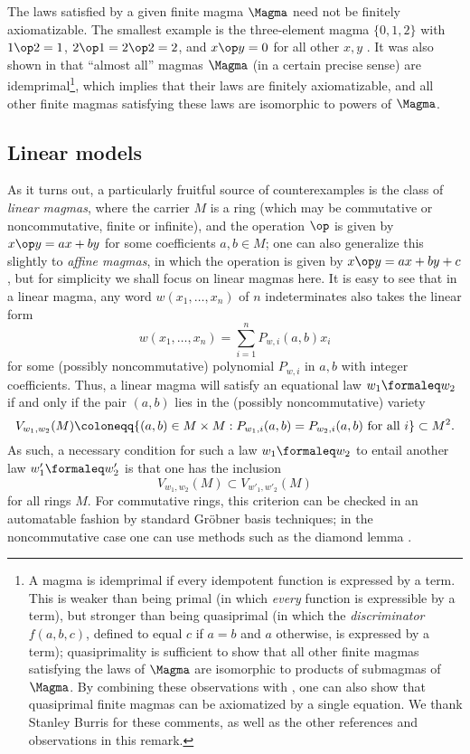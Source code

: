 \begin{remark} The laws satisfied by a given finite magma $\Magma$ need not be finitely axiomatizable.  The smallest example is the three-element magma $\{0,1,2\}$ with $1 \op 2 = 1$, $2 \op 1 = 2 \op 2 = 2$, and $x \op y = 0$ for all other $x,y$ \cite{murskii-1}.  It was also shown in \cite{murskii-2} that ``almost all'' magmas $\Magma$ (in a certain precise sense) are idemprimal\footnote{A magma is idemprimal if every idempotent function is expressed by a term.  This is weaker than being primal (in which \emph{every} function is expressible by a term), but stronger than being quasiprimal (in which the \emph{discriminator} $f(a,b,c)$, defined to equal $c$ if $a=b$ and $a$ otherwise, is expressed by a term); quasiprimality is sufficient to show that all other finite magmas satisfying the laws of $\Magma$ are isomorphic to products of submagmas of $\Magma$.  By combining these observations with \cite{Padmanabhan}, one can also show that quasiprimal finite magmas can be axiomatized by a single equation.  We thank Stanley Burris for these comments, as well as the other references and observations in this remark.}, which implies that their laws are finitely axiomatizable, and all other finite magmas satisfying these laws are isomorphic to powers of $\Magma$.
\end{remark}

\subsection{Linear models}\label{linear-sec}

As it turns out, a particularly fruitful source of counterexamples is the class of \emph{linear magmas}, where the carrier $M$ is a ring (which may be commutative or noncommutative, finite or infinite), and the operation $\op$ is given by $x \op y = ax + by$ for some coefficients $a,b \in M$; one can also generalize this slightly to \emph{affine magmas}, in which the operation is given by $x \op y = ax + by + c$, but for simplicity we shall focus on linear magmas here.  It is easy to see that in a linear magma, any word $w(x_1,\dots,x_n)$ of $n$ indeterminates also takes the linear form
$$ w(x_1,\dots,x_n) = \sum_{i=1}^n P_{w,i}(a,b) x_i$$
for some (possibly noncommutative) polynomial $P_{w,i}$ in $a,b$ with integer coefficients.  Thus, a linear magma will satisfy an equational law $w_1 \formaleq w_2$ if and only if the pair $(a,b)$ lies in the (possibly noncommutative) variety
\begin{equation}\label{variety}
  V_{w_1,w_2}(M) \coloneqq \{ (a,b) \in M \times M: P_{w_1,i}(a,b) = P_{w_2,i}(a,b) \hbox{ for all } i \} \subset M^2.
\end{equation}
As such, a necessary condition for such a law $w_1 \formaleq w_2$ to entail another law $w'_1 \formaleq w'_2$ is that one has the inclusion
$$ V_{w_1,w_2}(M) \subset V_{w'_1,w'_2}(M)
$$
for all rings $M$.  For commutative rings, this criterion can be checked in an automatable fashion by standard Gr\"obner basis techniques; in the noncommutative case one can use methods such as the diamond lemma \cite{diamond-lemma}.

